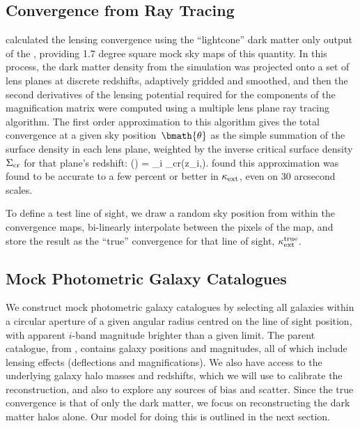 \documentclass[useAMS,usenatbib]{mn2e}
\begin{document}

\subsection{Convergence from Ray Tracing}
\label{sec:MS:raytracing}

\citet{HilbertEtal2009} calculated the lensing convergence using the
``lightcone'' dark matter only 
output of the \MS, providing 1.7 degree square 
mock sky maps of this
quantity. In this process, the dark matter density from the simulation
was projected onto a set of lens planes at discrete redshifts,
adaptively gridded and smoothed, and then the second derivatives of the 
lensing potential required for the components of the magnification
matrix were computed using a multiple lens plane ray tracing algorithm.
The first order approximation to this algorithm \citep[equation 17
of][]{HilbertEtal2009} gives the total convergence at a given sky
position~$\bmath{\theta}$ as the simple summation of the surface density
in each lens plane, weighted by the inverse critical surface density
$\Sigma_{\rm cr}$ for that plane's redshift:
\be
\kappax(\bmath{\theta}) = \sum_i 
                                     {\Sigma_{\rm cr}(z_i,\zs)}.
\ee
\citet{HilbertEtal2009} found this approximation was found to be accurate to a few percent or better
in $\kappa_{\rm ext}$, even on 30 arcsecond scales.

To define a test line of sight, we draw a random sky position from
within the convergence maps, bi-linearly interpolate between the pixels
of the map, and store the result as the ``true'' convergence for that
line of sight, $\kappa_{\rm ext}^{\rm true}$. 


\subsection{Mock Photometric Galaxy Catalogues}
\label{sec:MS:mocks}

We construct mock photometric galaxy catalogues by selecting all \MS
galaxies within a circular aperture of a given angular radius centred on
the line of sight position, with apparent $i$-band magnitude brighter
than a given limit. The parent catalogue, from \citet{HilbertEtal2011},
contains galaxy positions and magnitudes, all of which include lensing
effects (deflections and magnifications). We also have access to the
underlying galaxy halo masses and redshifts, which we will use to
calibrate the reconstruction, and also to explore any sources of bias
and scatter. Since the true convergence is that of only the dark matter,
we focus on reconstructing the dark matter halos alone. Our model for
doing this is outlined in the next section. 
\end{document}
